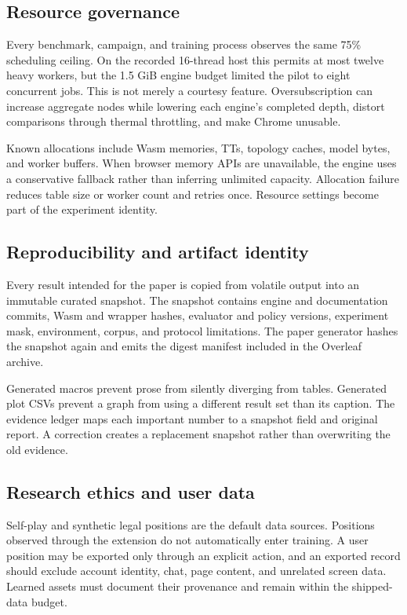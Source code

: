 \subsection{Resource governance}
Every benchmark, campaign, and training process observes the same 75\% scheduling ceiling. On the recorded 16-thread host this permits at most twelve heavy workers, but the 1.5 GiB engine budget limited the pilot to eight concurrent jobs. This is not merely a courtesy feature. Oversubscription can increase aggregate nodes while lowering each engine's completed depth, distort comparisons through thermal throttling, and make Chrome unusable.

Known allocations include Wasm memories, TTs, topology caches, model bytes, and worker buffers. When browser memory APIs are unavailable, the engine uses a conservative fallback rather than inferring unlimited capacity. Allocation failure reduces table size or worker count and retries once. Resource settings become part of the experiment identity.

\subsection{Reproducibility and artifact identity}
Every result intended for the paper is copied from volatile output into an immutable curated snapshot. The snapshot contains engine and documentation commits, Wasm and wrapper hashes, evaluator and policy versions, experiment mask, environment, corpus, and protocol limitations. The paper generator hashes the snapshot again and emits the digest manifest included in the Overleaf archive.

Generated macros prevent prose from silently diverging from tables. Generated plot CSVs prevent a graph from using a different result set than its caption. The evidence ledger maps each important number to a snapshot field and original report. A correction creates a replacement snapshot rather than overwriting the old evidence.

\subsection{Research ethics and user data}
Self-play and synthetic legal positions are the default data sources. Positions observed through the extension do not automatically enter training. A user position may be exported only through an explicit action, and an exported record should exclude account identity, chat, page content, and unrelated screen data. Learned assets must document their provenance and remain within the shipped-data budget.
